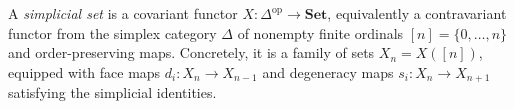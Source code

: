 
A \emph{simplicial set} is a covariant functor $X:\Delta^{\mathrm{op}}\to\mathbf{Set}$, equivalently a contravariant functor from the simplex category $\Delta$ of nonempty finite ordinals $[n]=\{0,\ldots,n\}$ and order-preserving maps. Concretely, it is a family of sets $X_n=X([n])$, equipped with face maps $d_i:X_n\to X_{n-1}$ and degeneracy maps $s_i:X_n\to X_{n+1}$ satisfying the simplicial identities.

